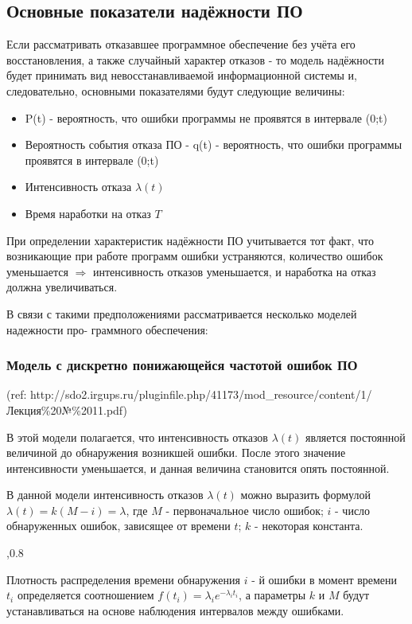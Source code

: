 \documentclass[a4paper, 12pt]{extarticle}
\begin{document}
		\subsection{Основные показатели надёжности ПО}
		Если рассматривать отказавшее программное обеспечение без учёта его восстановления, а также случайный характер отказов - то модель надёжности будет принимать вид невосстанавливаемой информационной системы и, следовательно, основными показателями будут следующие величины:
		\begin{itemize}
			\item P(t) - вероятность, что ошибки программы не проявятся в интервале (0;t)
			\item Вероятность события отказа ПО - q(t) - вероятность, что ошибки программы проявятся в интервале (0;t)
			\item Интенсивность отказа $\lambda(t)$
			\item Время наработки на отказ $T$
		\end{itemize}
		
		При определении характеристик надёжности ПО учитывается тот факт, что возникающие при работе программ ошибки устраняются, количество ошибок уменьшается $\Rightarrow$ интенсивность отказов уменьшается, и наработка на отказ должна увеличиваться. 
	 
	 В связи с такими предположениями рассматривается несколько моделей надежности про-
граммного обеспечения:

	\subsubsection{Модель   с  дискретно понижающейся частотой ошибок ПО} 
		(ref: http://sdo2.irgups.ru/pluginfile.php/41173/mod\_resource/content/1/Лекция\%20№\%2011.pdf)		
		
		В этой модели полагается, что интенсивность отказов $\lambda(t)$ является постоянной величиной до обнаружения возникшей ошибки. После этого значение интенсивности уменьшается, и данная величина становится опять постоянной. 
		
		В данной модели интенсивность отказов $\lambda(t)$ можно выразить формулой $\lambda(t) = k(M-i) = \lambda$, где $M$ - первоначальное число ошибок; $i$ -  число обнаруженных ошибок, зависящее от времени $t$; $k$ - некоторая константа. 
		
		,0.8
	
		Плотность распределения времени обнаружения $i$ - й ошибки в момент времени $t_i$
 определяется соотношением $f(t_i) =\lambda_i e^{-\lambda_it_i}$, а параметры $k$ и $M$ будут устанавливаться на основе наблюдения интервалов между ошибками. 
 
\end{document}
